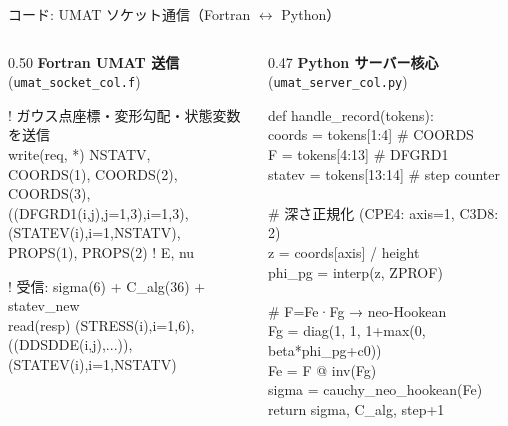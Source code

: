 \documentclass[
  ignorenonframetext,
  aspectratio=169,
]{beamer}
\begin{document}
\begin{frame}[fragile]{コード: UMAT ソケット通信（Fortran $\leftrightarrow$ Python）}
\protect\hypertarget{code-umat-socket}{}

\begin{columns}[T]
\begin{column}{0.50\textwidth}
\textbf{Fortran UMAT 送信} (\texttt{umat\_socket\_col.f})\\[2pt]
{\footnotesize\ttfamily
\begin{tabbing}
! ガウス点座標・変形勾配・状態変数を送信\\
write(req, *) NSTATV, \\
\quad\quad COORDS(1), COORDS(2), COORDS(3),  \\
\quad\quad ((DFGRD1(i,j),j=1,3),i=1,3), \\
\quad\quad (STATEV(i),i=1,NSTATV), \\
\quad\quad PROPS(1), PROPS(2)   ! E, nu
\end{tabbing}
\vspace{-4pt}
\begin{tabbing}
! 受信: sigma(6) + C\_alg(36) + statev\_new\\
read(resp) (STRESS(i),i=1,6), \\
\quad\quad  ((DDSDDE(i,j),...)), \\
\quad\quad  (STATEV(i),i=1,NSTATV)
\end{tabbing}
}
\end{column}
\begin{column}{0.47\textwidth}
\textbf{Python サーバー核心} (\texttt{umat\_server\_col.py})\\[2pt]
{\footnotesize\ttfamily
\begin{tabbing}
def handle\_record(tokens):\\
\quad coords = tokens[1:4]   \# COORDS\\
\quad F     = tokens[4:13]   \# DFGRD1\\
\quad statev = tokens[13:14] \# step counter\\
\\
\quad \# 深さ正規化 (CPE4: axis=1, C3D8: 2)\\
\quad z = coords[axis] / height\\
\quad phi\_pg = interp(z, ZPROF)\\
\\
\quad \# F=Fe·Fg → neo-Hookean\\
\quad Fg = diag(1, 1, 1+max(0, beta*phi\_pg+c0))\\
\quad Fe = F @ inv(Fg)\\
\quad sigma = cauchy\_neo\_hookean(Fe)\\
\quad return sigma, C\_alg, step+1
\end{tabbing}
}
\end{column}
\end{columns}
\end{frame}
\end{document}
